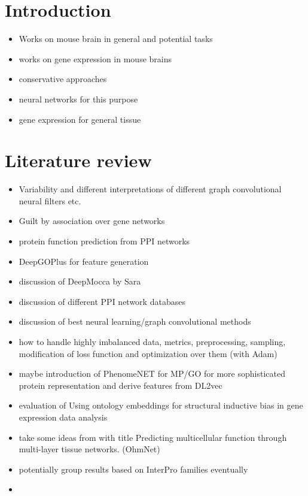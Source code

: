 \documentclass[]{article}
\renewcommand{\cite}{\citep}
\begin{document}
\section{Introduction}

\begin{itemize}
	\item Works on mouse brain in general and potential tasks
	\item works on gene expression in mouse brains
	\item conservative approaches
	\item neural networks for this purpose
	\item gene expression for general tissue
	
\end{itemize}

\section{Literature review}

\begin{itemize}
	\item Variability and different interpretations of different graph convolutional neural filters \cite{GCNConv, GENConv2020, SAGEConv} etc.
	\item Guilt by association over gene networks \cite{Oliver2000, Gillis2012}
	\item protein function prediction from PPI networks \cite{Vazquez2003}
	\item DeepGOPlus for feature generation \cite{DeepGoPlus}
	\item discussion of DeepMocca by Sara \cite{DeepMocca2021}
	\item discussion of different PPI network databases \cite{STRINGv10}
	\item discussion of best neural learning/graph convolutional methods \cite{Pytorch, PytorchGeometric}
	\item how to handle highly imbalanced data, metrics, preprocessing, sampling, modification of loss function \cite{Jeni2013} and optimization over them (with Adam\cite{Adam2014})
	\item maybe introduction of PhenomeNET for MP/GO for more sophisticated protein representation \cite{PhenomeNET2011, GOoriginal2000, GOrecent2020, MP2009} and derive features from DL2vec \cite{DL2vec2020, Word2vec2013}
	\item evaluation of \glqq Using ontology embeddings for structural inductive bias in gene expression data analysis\grqq{}\cite{Trebacz2020}
	\item take some ideas from \citet{Zitnik2017} with title \glqq Predicting multicellular function through multi-layer tissue networks\grqq{}. (OhmNet)
	\item potentially group results based on InterPro\cite{Interpro2020} families eventually
	\item 
	
	
\end{itemize}
\end{document}

